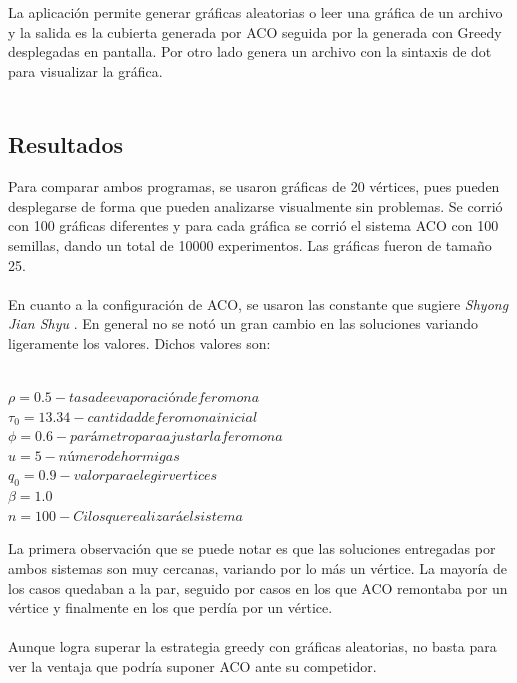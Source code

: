 \documentclass[oneside,12pt]{article}
\begin{document}
La aplicación permite generar gráficas aleatorias o leer una gráfica de un archivo y la salida es la cubierta generada por ACO seguida por la generada con Greedy desplegadas en pantalla. Por otro lado genera un archivo con la sintaxis de dot para visualizar la gráfica.\\\\

\subsection{Resultados}
Para comparar ambos programas, se usaron gráficas de 20 vértices, pues pueden desplegarse de forma que pueden analizarse visualmente sin problemas. Se corrió con 100 gráficas diferentes y para cada gráfica se corrió el sistema ACO con 100 semillas, dando un total de 10000 experimentos. Las gráficas fueron de tamaño 25.\\\\
En cuanto a la configuración de ACO, se usaron las constante que sugiere \emph{Shyong Jian Shyu} \cite{ACOorigen}. En general no se notó un gran cambio en las soluciones variando ligeramente los valores. Dichos valores son:\\\\

\begin{center}
$\rho = 0.5 - tasa de evaporación de feromona$\\
$\tau_{0} = 13.34 - cantidad de feromona inicial$\\
$\phi = 0.6 - parámetro para ajustar la feromona$\\
$u = 5 - número de hormigas$\\
$ q_{0} = 0.9  - valor para elegir vertices$\\
$\beta = 1.0$\\
$n = 100 - Cilos que realizará el sistema $\\
\end{center}

La primera observación que se puede notar es que las soluciones entregadas por ambos sistemas son muy cercanas, variando por  lo más un vértice. La mayoría de los casos quedaban a la par, seguido por casos en los que ACO remontaba por un vértice y finalmente en los que perdía por un vértice.\\\\

Aunque logra superar la estrategia greedy con gráficas aleatorias, no basta para ver la ventaja que podría suponer ACO ante su competidor.\\\\
 
\end{document}
